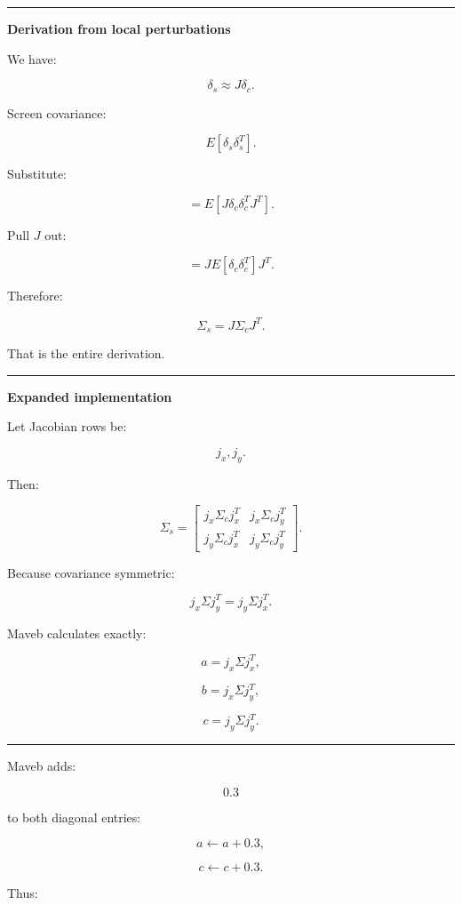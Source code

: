 \begin{center}\rule{0.5\linewidth}{0.5pt}\end{center}

\textbf{Derivation from local perturbations}

We have:

\[
\delta_s
\approx
J\delta_c.
\]

Screen covariance:

\[
E[
\delta_s
\delta_s^T
].
\]

Substitute:

\[
=
E[
J\delta_c
\delta_c^T
J^T
].
\]

Pull \(J\) out:

\[
=
J
E[
\delta_c\delta_c^T
]
J^T.
\]

Therefore:

\[
\boxed{
\Sigma_s=
J\Sigma_cJ^T.
}
\]

That is the entire derivation.

\begin{center}\rule{0.5\linewidth}{0.5pt}\end{center}

\textbf{Expanded implementation}

Let Jacobian rows be:

\[
j_x,
j_y.
\]

Then:

\[
\Sigma_s=
\begin{bmatrix}
j_x\Sigma_cj_x^T
&
j_x\Sigma_cj_y^T
\\
j_y\Sigma_cj_x^T
&
j_y\Sigma_cj_y^T
\end{bmatrix}.
\]

Because covariance symmetric:

\[
j_x\Sigma j_y^T
=
j_y\Sigma j_x^T.
\]

Maveb calculates exactly:

\[
a=j_x\Sigma j_x^T,
\]

\[
b=j_x\Sigma j_y^T,
\]

\[
c=j_y\Sigma j_y^T.
\]

\begin{center}\rule{0.5\linewidth}{0.5pt}\end{center}

Maveb adds:

\[
0.3
\]

to both diagonal entries:

\[
a\leftarrow a+0.3,
\]

\[
c\leftarrow c+0.3.
\]

Thus:

